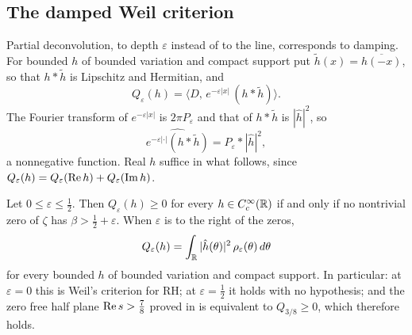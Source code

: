 \subsection{The damped Weil criterion}\label{dc:sec:damped}

Partial deconvolution, to depth $\varepsilon$ instead of to the line, corresponds to damping. For bounded $h$ of bounded variation and compact support put $\tilde h(x)=\overline{h(-x)}$, so that $h*\tilde h$ is Lipschitz and Hermitian, and
\[
Q_\varepsilon(h)=\big\langle D,\,e^{-\varepsilon|x|}\,(h*\tilde h)\big\rangle .
\]
The Fourier transform of $e^{-\varepsilon|x|}$ is $2\pi P_\varepsilon$ and that of $h*\tilde h$ is $|\hat h|^2$, so
\[
\widehat{e^{-\varepsilon|\cdot|}(h*\tilde h)}=P_\varepsilon*|\hat h|^2 ,
\]
a nonnegative function. Real $h$ suffice in what follows, since $Q_\varepsilon(h)=Q_\varepsilon(\operatorname{Re} h)+Q_\varepsilon(\operatorname{Im} h)$.

\begin{theorem}\label{dc:thm:damped}
Let $0\le\varepsilon\le\frac12$. Then $Q_\varepsilon(h)\ge0$ for every $h\in C_c^\infty(\mathbb{R})$ if and only if no nontrivial zero of $\zeta$ has $\beta>\frac12+\varepsilon$. When $\varepsilon$ is to the right of the zeros,
\begin{equation}\label{dc:eq:Qw}
Q_\varepsilon(h)=\int_{\mathbb{R}}|\hat h(\theta)|^2\,\rho_\varepsilon(\theta)\,d\theta
\end{equation}
for every bounded $h$ of bounded variation and compact support. In particular: at $\varepsilon=0$ this is Weil's criterion for RH; at $\varepsilon=\frac12$ it holds with no hypothesis; and the zero free half plane $\operatorname{Re} s>\frac78$ proved in \cite{OAI26a} is equivalent to $Q_{3/8}\ge0$, which therefore holds.
\end{theorem}

